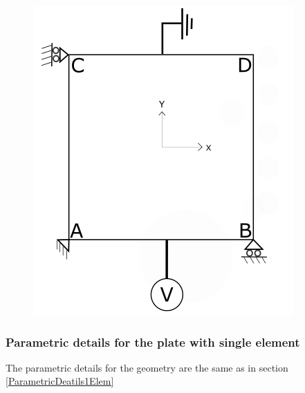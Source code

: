 \documentclass[11pt]{article}
\begin{document}
\begin{figure}[H]
\begin{minipage}{.4\textwidth}
		\includegraphics[width=1\linewidth]{PureElectrical.png}
		\label{PureElectrical22}
	\end{minipage}
\end{figure}
\subsubsection{Parametric details for the plate with single element}


The parametric details for the geometry are the same as in section \hyperref[ParametricDeatils1Elem]{\ref{ParametricDeatils1Elem}}
\end{document}
